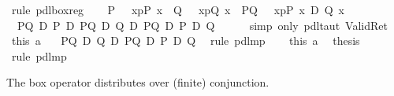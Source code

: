 \begin{isabellebody}
\ {\isacharparenleft}rule\ pdl{\isacharunderscore}box{\isacharunderscore}reg{\isacharparenright}\isanewline
\ \ \isamarkupfalse%
\ {\isacharquery}P\ {\isacharequal}\ {\isachardoublequote}{\isacharbrackleft}{\isacharhash}\ x{\isasymleftarrow}p{\isacharbrackright}{\isacharparenleft}P\ x{\isacharparenright}{\isachardoublequote}\ \ {\isacharquery}Q\ {\isacharequal}\ {\isachardoublequote}{\isacharbrackleft}{\isacharhash}\ x{\isasymleftarrow}p{\isacharbrackright}{\isacharparenleft}Q\ x{\isacharparenright}{\isachardoublequote}\ \ {\isacharquery}PQ\ {\isacharequal}\ {\isachardoublequote}{\isacharbrackleft}{\isacharhash}\ x{\isasymleftarrow}p{\isacharbrackright}{\isacharparenleft}P\ x\ {\isasymand}\isactrlsub D\ Q\ x{\isacharparenright}{\isachardoublequote}\isanewline
\ \ \isamarkupfalse%
\ {\isachardoublequote}{\isasymturnstile}\ {\isacharparenleft}{\isacharquery}PQ\ {\isasymlongrightarrow}\isactrlsub D\ {\isacharquery}P{\isacharparenright}\ {\isasymlongrightarrow}\isactrlsub D\ {\isacharparenleft}{\isacharquery}PQ\ {\isasymlongrightarrow}\isactrlsub D\ {\isacharquery}Q{\isacharparenright}\ {\isasymlongrightarrow}\isactrlsub D\ {\isacharparenleft}{\isacharquery}PQ\ {\isasymlongrightarrow}\isactrlsub D\ {\isacharquery}P\ {\isasymand}\isactrlsub D\ {\isacharquery}Q{\isacharparenright}{\isachardoublequote}\isanewline
\ \ \ \ \isamarkupfalse%
\ {\isacharparenleft}simp\ only{\isacharcolon}\ pdl{\isacharunderscore}taut\ Valid{\isacharunderscore}Ret{\isacharparenright}\isanewline
\ \ \isamarkupfalse%
\ this\ a{}\ \isamarkupfalse%
\ {\isachardoublequote}{\isasymturnstile}\ {\isacharparenleft}{\isacharquery}PQ\ {\isasymlongrightarrow}\isactrlsub D\ {\isacharquery}Q{\isacharparenright}\ {\isasymlongrightarrow}\isactrlsub D\ {\isacharparenleft}{\isacharquery}PQ\ {\isasymlongrightarrow}\isactrlsub D\ {\isacharquery}P\ {\isasymand}\isactrlsub D\ {\isacharquery}Q{\isacharparenright}{\isachardoublequote}\ \isamarkupfalse%
\ {\isacharparenleft}rule\ pdl{\isacharunderscore}mp{\isacharparenright}\isanewline
\ \ \isamarkupfalse%
\ this\ a{}\ \isamarkupfalse%
\ {\isacharquery}thesis\ \isamarkupfalse%
\ {\isacharparenleft}rule\ pdl{\isacharunderscore}mp{\isacharparenright}\isanewline
\isamarkupfalse%
\isamarkupfalse%
%
\begin{isamarkuptext}%
The box operator distributes over (finite) conjunction.%
\end{isamarkuptext}%

\end{isabellebody}
